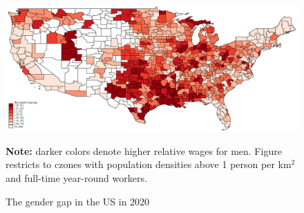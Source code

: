\begin{figure}[!h]
\centering
\caption{The gender gap in the US in 2020}
\label{fig:gap_map2020}
\includegraphics[width=1\textwidth]{../2_analysis/output/figures/raw_wage_map2020_full_time}
\par \begin{minipage}[h]{\textwidth}{\tiny\textbf{Note:} darker colors denote higher relative wages for men. Figure restricts to czones with population densities above 1 person per km$^2$ and full-time year-round workers.}\end{minipage}
\end{figure}
